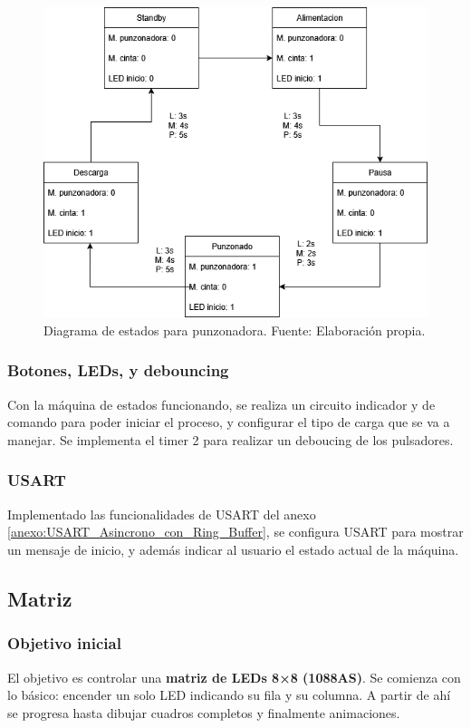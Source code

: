 \begin{figure}[H]
  \centering
  \includegraphics[width=\linewidth]{./Anexos/Metodologia/Punzonadora/Diagrama de estados.png}
  \caption{Diagrama de estados para punzonadora. Fuente: Elaboración propia.}
  \label{fig:punzoadora_estados}
\end{figure}

\subsubsection{Botones, LEDs,  y debouncing}
Con la máquina de estados funcionando, se realiza un circuito indicador y de comando para poder iniciar el proceso, y configurar el tipo de carga que se va a manejar. Se implementa el timer 2 para realizar un deboucing de los pulsadores. 

\subsubsection{USART}
Implementado las funcionalidades de USART del anexo \ref{anexo:USART_Asincrono_con_Ring_Buffer}, se configura USART para mostrar un mensaje de inicio, y además indicar al usuario el estado actual de la máquina.

\subsection{Matriz}

\subsubsection{Objetivo inicial}
El objetivo es controlar una \textbf{matriz de LEDs 8×8 (1088AS)}. Se comienza con lo básico: encender un solo LED indicando su fila y su columna. A partir de ahí se progresa hasta dibujar cuadros completos y finalmente animaciones.

